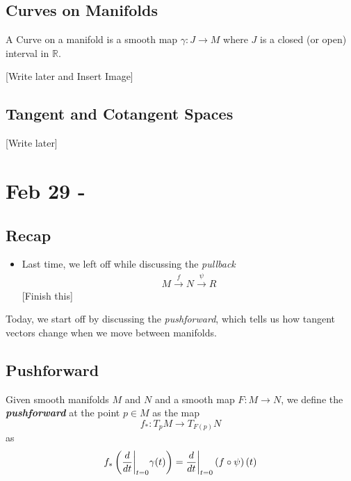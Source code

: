 \documentclass{article}
\newcommand{\R}{\mathbb{R}}
\newcommand{\restr}[2]{{%
  \left.\kern-\nulldelimiterspace %
  #1 %
  \vphantom{\big|} %
  \right|_{#2} %
  }}
\begin{document}
\vskip 0.25cm
\subsection*{Curves on Manifolds}

\begin{mathdefinitionbox}{}
  A Curve on a manifold is a smooth map $\gamma : J \rightarrow M$ where $J$ is a closed (or open) interval in $\R$.
\end{mathdefinitionbox}

[Write later and Insert Image]


\vskip 1cm
\subsection{Tangent and Cotangent Spaces}
[Write later]

\pagebreak

\section{Feb 29 - }

\vskip 0.5cm
\subsection*{Recap}
\begin{itemize}
  \item Last time, we left off while discussing the \emph{pullback}
  \begin{align*}
    M \xrightarrow{f} N \xrightarrow{\psi} R
  \end{align*}
  [Finish this]
\end{itemize}

\vskip 0.5cm
Today, we start off by discussing the \emph{pushforward}, which tells us how tangent vectors change when we move between manifolds.

\vskip 0.5cm
\subsection*{Pushforward}

\begin{mathdefinitionbox}{}
  Given smooth manifolds $M$ and $N$ and a smooth map $F : M \rightarrow N$, we define the \emph{\textbf{pushforward}} at the point $p \in M$ as the map 
  \[ f_* : T_p M \rightarrow T_{F(p)} N \]
  as 
  \[ f_* \left( \restr{\frac{d}{dt}}{t = 0}  \gamma(t) \right) = \restr{\frac{d}{dt}}{t = 0} \left(f \circ \psi \right)(t) \]
\end{mathdefinitionbox}
\end{document}
